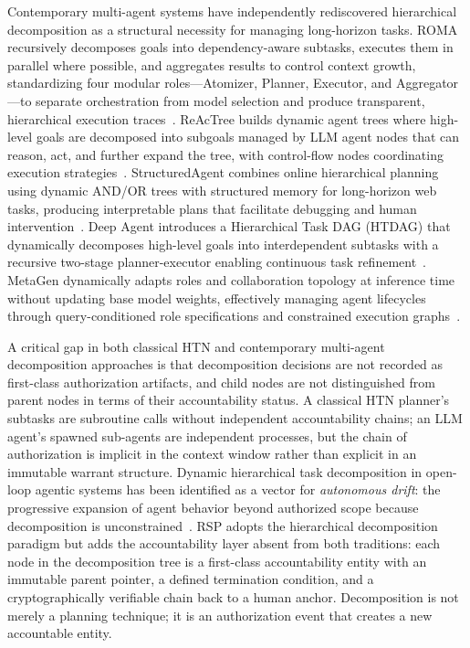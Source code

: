 Contemporary multi-agent systems have independently rediscovered hierarchical decomposition as a structural necessity for managing long-horizon tasks. ROMA recursively decomposes goals into dependency-aware subtasks, executes them in parallel where possible, and aggregates results to control context growth, standardizing four modular roles---Atomizer, Planner, Executor, and Aggregator---to separate orchestration from model selection and produce transparent, hierarchical execution traces~\cite{roma2025}. ReAcTree builds dynamic agent trees where high-level goals are decomposed into subgoals managed by LLM agent nodes that can reason, act, and further expand the tree, with control-flow nodes coordinating execution strategies~\cite{reactree2025}. StructuredAgent combines online hierarchical planning using dynamic AND/OR trees with structured memory for long-horizon web tasks, producing interpretable plans that facilitate debugging and human intervention~\cite{structuredagent2025}. Deep Agent introduces a Hierarchical Task DAG (HTDAG) that dynamically decomposes high-level goals into interdependent subtasks with a recursive two-stage planner-executor enabling continuous task refinement~\cite{deepagent2025}. MetaGen dynamically adapts roles and collaboration topology at inference time without updating base model weights, effectively managing agent lifecycles through query-conditioned role specifications and constrained execution graphs~\cite{metag2025}.

A critical gap in both classical HTN and contemporary multi-agent decomposition approaches is that decomposition decisions are not recorded as first-class authorization artifacts, and child nodes are not distinguished from parent nodes in terms of their accountability status. A classical HTN planner's subtasks are subroutine calls without independent accountability chains; an LLM agent's spawned sub-agents are independent processes, but the chain of authorization is implicit in the context window rather than explicit in an immutable warrant structure. Dynamic hierarchical task decomposition in open-loop agentic systems has been identified as a vector for \emph{autonomous drift}: the progressive expansion of agent behavior beyond authorized scope because decomposition is unconstrained~\cite{autoGPT2023}. RSP adopts the hierarchical decomposition paradigm but adds the accountability layer absent from both traditions: each node in the decomposition tree is a first-class accountability entity with an immutable parent pointer, a defined termination condition, and a cryptographically verifiable chain back to a human anchor. Decomposition is not merely a planning technique; it is an authorization event that creates a new accountable entity.

